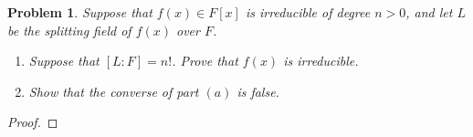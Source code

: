 \documentclass[10pt]{article}
\newcommand{\sk}{\vskip 10mm}
\theoremstyle{plain}
\newtheorem{problem}{Problem}
\theoremstyle{remark}
\begin{document}
\sk

\begin{problem}
  Suppose that $f(x) \in F[x]$ is irreducible of degree $n > 0$,
  and let $L$ be the splitting field of $f(x)$ over $F$.
\begin{enumerate}
    \item Suppose that $[L:F]=n!$. Prove that $f(x)$ is irreducible.
    \item Show that the converse of part $(a)$ is false.
\end{enumerate}
\end{problem}

\begin{proof}
  
\end{proof}

\end{document}
